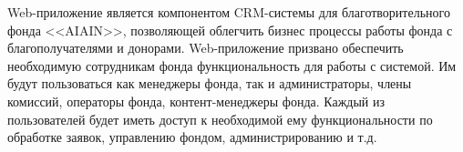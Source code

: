 Web-приложение является компонентом CRM-системы для благотворительного фонда <<AIAIN>>, позволяющей облегчить бизнес процессы работы фонда с благополучателями и донорами. Web-приложение призвано обеспечить необходимую сотрудникам фонда функциональность для работы с системой. Им будут пользоваться как менеджеры фонда, так и администраторы, члены комиссий, операторы фонда, контент-менеджеры фонда. Каждый из пользователей будет иметь доступ к необходимой ему функциональности по обработке заявок, управлению фондом, администрированию и т.д.
